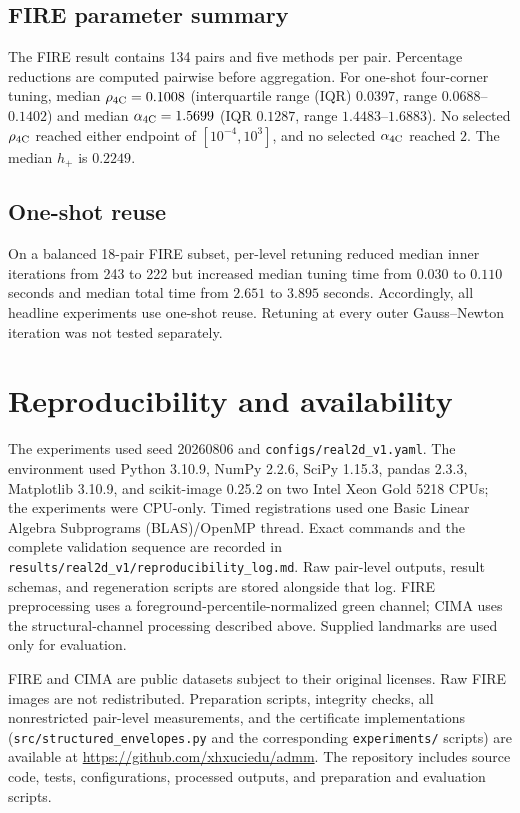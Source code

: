 \documentclass[11pt]{article}
\begin{document}
\subsection{FIRE parameter summary}
The FIRE result contains 134 pairs and five methods per pair. Percentage
reductions are computed pairwise before aggregation. For one-shot four-corner
tuning, median $\rho_{\rm 4C}=0.1008$ (interquartile range (IQR) $0.0397$,
range $0.0688$--$0.1402$) and median $\alpha_{\rm 4C}=1.5699$ (IQR $0.1287$, range
$1.4483$--$1.6883$). No selected $\rho_{\rm 4C}$ reached either endpoint of
$[10^{-4},10^3]$, and no selected $\alpha_{\rm 4C}$ reached $2$. The median
$h_+$ is $0.2249$.

\subsection{One-shot reuse}
On a balanced 18-pair FIRE subset, per-level retuning reduced median inner
iterations from 243 to 222 but increased median tuning time from $0.030$ to
$0.110$ seconds and median total time from $2.651$ to $3.895$ seconds.
Accordingly, all headline experiments use one-shot reuse. Retuning at every
outer Gauss--Newton iteration was not tested separately.

\section{Reproducibility and availability}
The experiments used seed 20260806 and
\texttt{configs/real2d\_v1.yaml}. The environment used
Python 3.10.9, NumPy 2.2.6, SciPy 1.15.3, pandas 2.3.3,
Matplotlib 3.10.9, and scikit-image 0.25.2 on two Intel Xeon Gold 5218 CPUs;
the experiments were CPU-only. Timed registrations used one Basic Linear
Algebra Subprograms (BLAS)/OpenMP thread.
Exact commands and the complete validation sequence are recorded in
\texttt{results/real2d\_v1/reproducibility\_log.md}. Raw pair-level outputs,
result schemas, and regeneration scripts are stored alongside that log. FIRE
preprocessing uses a foreground-percentile-normalized green channel; CIMA uses
the structural-channel processing described above. Supplied landmarks are used only for
evaluation.

FIRE and CIMA are public datasets subject to their original licenses. Raw FIRE
images are not redistributed. Preparation scripts, integrity checks, all
nonrestricted pair-level measurements, and the certificate implementations
(\texttt{src/structured\_envelopes.py} and the corresponding
\texttt{experiments/} scripts) are available at
\url{https://github.com/xhxuciedu/admm}. The repository includes source code,
tests, configurations, processed outputs, and preparation and evaluation
scripts.
\end{document}
